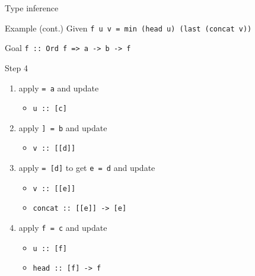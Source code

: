\documentclass{beamer}
\def\code#1{\texttt{\frenchspacing#1}}
\begin{document}
\begin{frame}{Type inference}

\begin{exampleblock}{Example (cont.)}
Given \code{f u v = min (head u) (last (concat v))} \par
Goal \code{f :: Ord f => a -> b -> f}

\vspace{0.25cm}
Step 4\pause
\begin{enumerate}
    \item apply \code{[c] = a} and update\pause
        \begin{itemize}
            \item \code{u :: [c]}\pause
        \end{itemize}
    \item apply \code{[[d]] = b} and update\pause
        \begin{itemize}
            \item \code{v :: [[d]]}\pause
        \end{itemize}
    \item apply \code{[e] = [d]} to get \code{e = d} and update\pause
        \begin{itemize}
            \item \code{v :: [[e]]}\pause
            \item \code{concat :: [[e]] -> [e]}\pause
        \end{itemize}
    \item apply \code{f = c} and update\pause
        \begin{itemize}
            \item \code{u :: [f]}\pause
            \item \code{head :: [f] -> f}
        \end{itemize}
\end{enumerate}
\end{exampleblock}

\end{frame}
\end{document}
